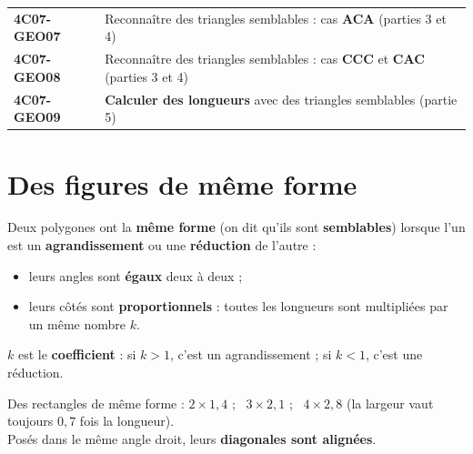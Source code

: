 \documentclass[11pt]{article}
\begin{document}
\begin{tcolorbox}[colback=white,colframe=black,boxrule=0.6pt,arc=2mm,title={\textbf{Ce que je dois savoir faire à la fin du chapitre}},coltitle=black,colbacktitle=gray!15]
\begin{tabular}{@{}ll@{}}
\textbf{4C07-GEO07} & Reconnaître des triangles semblables : cas \textbf{ACA} \hfill (parties 3 et 4)\\
\textbf{4C07-GEO08} & Reconnaître des triangles semblables : cas \textbf{CCC} et \textbf{CAC} \hfill (parties 3 et 4)\\
\textbf{4C07-GEO09} & \textbf{Calculer des longueurs} avec des triangles semblables \hfill (partie 5)\\
\end{tabular}
\end{tcolorbox}

\section{Des figures de même forme}

\begin{definition}
Deux polygones ont la \textbf{même forme} (on dit qu'ils sont \textbf{semblables}) lorsque l'un est un
\textbf{agrandissement} ou une \textbf{réduction} de l'autre :
\begin{itemize}
\item leurs angles sont \textbf{égaux} deux à deux ;
\item leurs côtés sont \textbf{proportionnels} : toutes les longueurs sont multipliées par un même nombre $k$.
\end{itemize}
$k$ est le \textbf{coefficient} : si $k > 1$, c'est un agrandissement ; si $k < 1$, c'est une réduction.
\end{definition}

\begin{minipage}{0.42\linewidth}
\begin{exemple}
Des rectangles de même forme : $2 \times 1,4$ ; \ $3 \times 2,1$ ; \ $4 \times 2,8$
(la largeur vaut toujours $0,7$ fois la longueur).\\
Posés dans le même angle droit, leurs \textbf{diagonales sont alignées}.
\end{exemple}
\end{minipage}\hfill
\begin{minipage}{0.55\linewidth}\centering
{}
\end{minipage}
\end{document}
